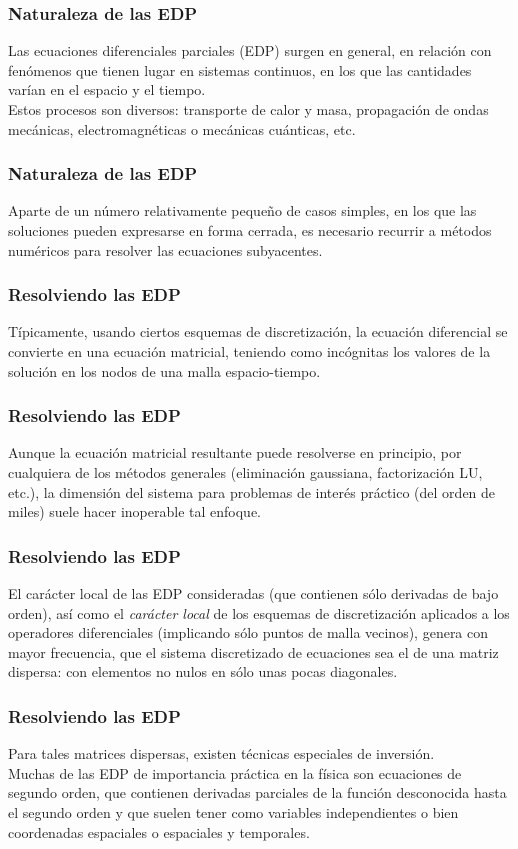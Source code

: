 \documentclass[12pt]{beamer}
\begin{document}
\begin{frame}
\frametitle{Naturaleza de las EDP}
Las ecuaciones diferenciales parciales (EDP) surgen en general, en relación con fenómenos que tienen lugar en sistemas continuos, en los que las cantidades varían en el espacio y el tiempo.
\\
\bigskip
\pause
Estos procesos son diversos: transporte de calor y masa, propagación de ondas mecánicas, electromagnéticas o mecánicas cuánticas, etc.
\end{frame}
\begin{frame}
\frametitle{Naturaleza de las EDP}
Aparte de un número relativamente pequeño de casos simples, en los que las soluciones pueden expresarse en forma cerrada, es necesario recurrir a métodos numéricos para resolver las ecuaciones subyacentes.
\end{frame}
\begin{frame}
\frametitle{Resolviendo las EDP}
Típicamente, usando ciertos esquemas de discretización, la ecuación diferencial se convierte en una ecuación matricial, teniendo como incógnitas los valores de la solución en los nodos de una malla espacio-tiempo.
\end{frame}
\begin{frame}
\frametitle{Resolviendo las EDP}
Aunque la ecuación matricial resultante puede resolverse en principio, por cualquiera de los métodos generales (eliminación gaussiana, factorización LU, etc.), la dimensión del sistema para problemas de interés práctico (del orden de miles) suele hacer inoperable tal enfoque.
\end{frame}
\begin{frame}
\frametitle{Resolviendo las EDP}
El carácter local de las EDP consideradas (que contienen sólo derivadas de bajo orden), así como el \emph{carácter local} de los esquemas de discretización aplicados a los operadores diferenciales (implicando sólo puntos de malla vecinos), \pause genera con mayor frecuencia, que el sistema discretizado de ecuaciones sea el de una matriz dispersa: con elementos no nulos en sólo unas pocas diagonales.
\end{frame}
\begin{frame}
\frametitle{Resolviendo las EDP}
Para tales matrices dispersas, existen técnicas especiales de inversión.
\\
\bigskip
\pause
Muchas de las EDP de importancia práctica en la física son ecuaciones de segundo orden, que contienen derivadas parciales de la función desconocida hasta el segundo orden y que suelen tener como variables independientes o bien coordenadas espaciales o espaciales y temporales.
\end{frame}
\end{document}
